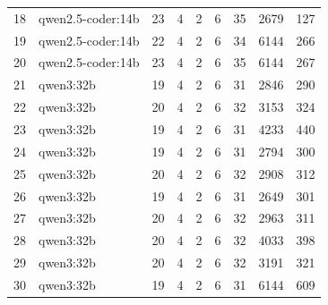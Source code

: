 \begin{table}[htbp]
{\begin{tabular}{|c|l|c|c|c|c|c|c|c|}
18 & qwen2.5-coder:14b    & 23 & 4 & 2 & 6 & 35 &  2679 &  127 \\
19 & qwen2.5-coder:14b    & 22 & 4 & 2 & 6 & 34 &  6144 &  266 \\
20 & qwen2.5-coder:14b    & 23 & 4 & 2 & 6 & 35 &  6144 &  267 \\
\hline
21 & qwen3:32b            & 19 & 4 & 2 & 6 & 31 &  2846 &  290 \\
22 & qwen3:32b            & 20 & 4 & 2 & 6 & 32 &  3153 &  324 \\
23 & qwen3:32b            & 19 & 4 & 2 & 6 & 31 &  4233 &  440 \\
24 & qwen3:32b            & 19 & 4 & 2 & 6 & 31 &  2794 &  300 \\
25 & qwen3:32b            & 20 & 4 & 2 & 6 & 32 &  2908 &  312 \\
26 & qwen3:32b            & 19 & 4 & 2 & 6 & 31 &  2649 &  301 \\
27 & qwen3:32b            & 20 & 4 & 2 & 6 & 32 &  2963 &  311 \\
28 & qwen3:32b            & 20 & 4 & 2 & 6 & 32 &  4033 &  398 \\
29 & qwen3:32b            & 20 & 4 & 2 & 6 & 32 &  3191 &  321 \\
30 & qwen3:32b            & 19 & 4 & 2 & 6 & 31 &  6144 &  609 \\
\hline
\end{tabular}
}%
\label{tab:rohdaten_runs}
\end{table}

\clearpage

\label{app:modell_summary_12}

